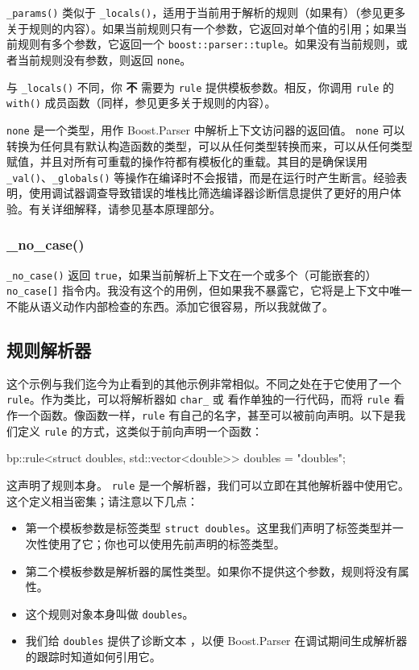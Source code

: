 \texttt{\_params()} 类似于 \texttt{\_locals()}，适用于当前用于解析的规则（如果有）（参见更多关于规则的内容）。如果当前规则只有一个参数，它返回对单个值的引用；如果当前规则有多个参数，它返回一个 \texttt{boost::parser::tuple}。如果没有当前规则，或者当前规则没有参数，则返回 \texttt{none}。

与 \texttt{\_locals()} 不同，你 \textbf{不} 需要为 \texttt{rule} 提供模板参数。相反，你调用 \texttt{rule} 的 \texttt{with()} 成员函数（同样，参见更多关于规则的内容）。

\begin{marker}
\texttt{none} 是一个类型，用作 Boost.Parser 中解析上下文访问器的返回值。 \texttt{none} 可以转换为任何具有默认构造函数的类型，可以从任何类型转换而来，可以从任何类型赋值，并且对所有可重载的操作符都有模板化的重载。其目的是确保误用 \texttt{\_val()}、\texttt{\_globals()} 等操作在编译时不会报错，而是在运行时产生断言。经验表明，使用调试器调查导致错误的堆栈比筛选编译器诊断信息提供了更好的用户体验。有关详细解释，请参见基本原理部分。
\end{marker}

\subsubsection{\_no\_case()}

\texttt{\_no\_case()} 返回 \texttt{true}，如果当前解析上下文在一个或多个（可能嵌套的）\texttt{no\_case{[}{]}} 指令内。我没有这个的用例，但如果我不暴露它，它将是上下文中唯一不能从语义动作内部检查的东西。添加它很容易，所以我就做了。

\subsection{规则解析器}

这个示例与我们迄今为止看到的其他示例非常相似。不同之处在于它使用了一个 \texttt{rule}。作为类比，可以将解析器如 \texttt{char\_} 或  看作单独的一行代码，而将 \texttt{rule} 看作一个函数。像函数一样，\texttt{rule} 有自己的名字，甚至可以被前向声明。以下是我们定义 \texttt{rule} 的方式，这类似于前向声明一个函数：

\begin{code}
bp::rule<struct doubles, std::vector<double>> doubles = "doubles";
\end{code}

这声明了规则本身。 \texttt{rule} 是一个解析器，我们可以立即在其他解析器中使用它。这个定义相当密集；请注意以下几点：

\begin{itemize}
\item
  第一个模板参数是标签类型 \texttt{struct doubles}。这里我们声明了标签类型并一次性使用了它；你也可以使用先前声明的标签类型。
\item
  第二个模板参数是解析器的属性类型。如果你不提供这个参数，规则将没有属性。
\item
  这个规则对象本身叫做 \texttt{doubles}。
\item
  我们给 \texttt{doubles} 提供了诊断文本 ，以便 Boost.Parser 在调试期间生成解析器的跟踪时知道如何引用它。
\end{itemize}

